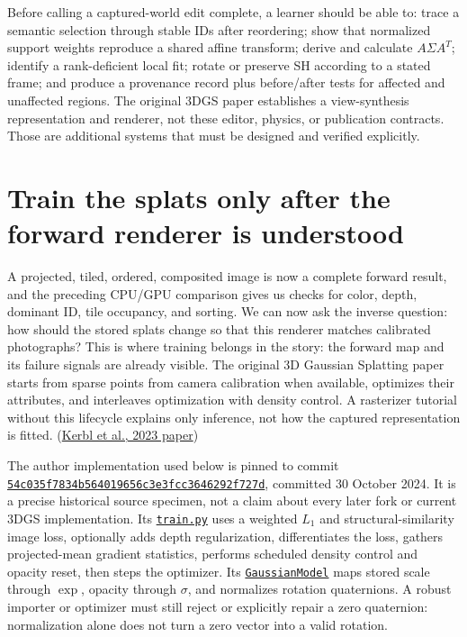 Before calling a captured-world edit complete, a learner should be able to: trace a semantic selection through stable IDs after reordering; show that normalized support weights reproduce a shared affine transform; derive and calculate \(A\Sigma A^T\); identify a rank-deficient local fit; rotate or preserve SH according to a stated frame; and produce a provenance record plus before/after tests for affected and unaffected regions. The original 3DGS paper establishes a view-synthesis representation and renderer, not these editor, physics, or publication contracts. Those are additional systems that must be designed and verified explicitly.

\section{Train the splats only after the forward renderer is understood}\label{04-visual-computing-ii-ch039-train-the-splats-only-after-the-forward-renderer-is-understood}

A projected, tiled, ordered, composited image is now a complete forward result, and the preceding CPU/GPU comparison gives us checks for color, depth, dominant ID, tile occupancy, and sorting. We can now ask the inverse question: how should the stored splats change so that this renderer matches calibrated photographs? This is where training belongs in the story: the forward map and its failure signals are already visible. The original 3D Gaussian Splatting paper starts from sparse points from camera calibration when available, optimizes their attributes, and interleaves optimization with density control. A rasterizer tutorial without this lifecycle explains only inference, not how the captured representation is fitted. (\href{https://arxiv.org/abs/2308.04079}{Kerbl et al., 2023 paper})

The author implementation used below is pinned to commit \href{https://github.com/graphdeco-inria/gaussian-splatting/commit/54c035f7834b564019656c3e3fcc3646292f727d}{\texttt{54c035f7834b564019656c3e3fcc3646292f727d}}, committed 30 October 2024. It is a precise historical source specimen, not a claim about every later fork or current 3DGS implementation. Its \href{https://github.com/graphdeco-inria/gaussian-splatting/blob/54c035f7834b564019656c3e3fcc3646292f727d/train.py\#L126-L186}{\texttt{train.py}} uses a weighted \(L_1\) and structural-similarity image loss, optionally adds depth regularization, differentiates the loss, gathers projected-mean gradient statistics, performs scheduled density control and opacity reset, then steps the optimizer. Its \href{https://github.com/graphdeco-inria/gaussian-splatting/blob/54c035f7834b564019656c3e3fcc3646292f727d/scene/gaussian_model.py\#L39-L47}{\texttt{GaussianModel}} maps stored scale through \(\exp\), opacity through \(\sigma\), and normalizes rotation quaternions. A robust importer or optimizer must still reject or explicitly repair a zero quaternion: normalization alone does not turn a zero vector into a valid rotation.

